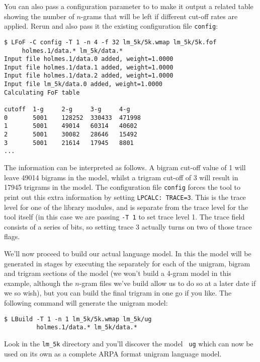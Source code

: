You can also pass a configuration parameter to  to make it
output a related table showing the number of $n$-grams that will be
left if different cut-off rates are applied.  Rerun  and
also pass it the existing configuration file {\tt config}:
\begin{verbatim}
$ LFoF -C config -T 1 -n 4 -f 32 lm_5k/5k.wmap lm_5k/5k.fof
     holmes.1/data.* lm_5k/data.*
Input file holmes.1/data.0 added, weight=1.0000
Input file holmes.1/data.1 added, weight=1.0000
Input file holmes.1/data.2 added, weight=1.0000
Input file lm_5k/data.0 added, weight=1.0000
Calculating FoF table

cutoff  1-g     2-g     3-g     4-g
0       5001    128252  330433  471998 
1       5001    49014   60314   40602 
2       5001    30082   28646   15492 
3       5001    21614   17945   8801 
...
\end{verbatim} %
The information can be interpreted as follows.  A bigram cut-off value
of 1 will leave 49014 bigrams in the model, whilst a trigram cut-off
of 3 will result in 17945 trigrams in the model.  The configuration
file \texttt{config} forces the tool to print out this extra
information by setting \texttt{LPCALC: TRACE=3}.  This is the trace
level for one of the library modules, and is separate from the trace
level for the tool itself (in this case we are passing {\tt -T 1} to
set trace level 1.  The trace field consists of a series of bits, so
setting trace 3 actually turns on two of those trace flags.

We'll now proceed to build our actual language model.  In this the
model will be generated in stages by executing the 
separately for each of the unigram, bigram and trigram sections of the
model (we won't build a 4-gram model in this example, although the
$n$-gram files we've build allow us to do so at a later date if we so
wish), but you can build the final trigram in one go if you like.  The
following command will generate the unigram model:
\begin{verbatim}
$ LBuild -T 1 -n 1 lm_5k/5k.wmap lm_5k/ug 
         holmes.1/data.* lm_5k/data.*
\end{verbatim} %
Look in the {\tt lm\_5k} directory and you'll discover the model {\tt
ug} which can now be used on its own as a complete ARPA format
unigram language model.

